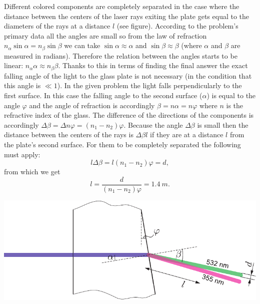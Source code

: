 \documentclass[11pt]{article}
\begin{document}
\solueng
Different colored components are completely separated in the case where the distance between the centers of the laser rays exiting the plate gets equal to the diameters of the rays at a distance $l$ (see figure). According to the problem’s primary data all the angles are small so from the law of refraction $n_\alpha\sin\alpha=n_\beta\sin\beta$ we can take $\sin\alpha\approx\alpha$ and $\sin\beta\approx\beta$ (where $\alpha$ and $\beta$ are measured in radians). Therefore the relation between the angles starts to be linear: $n_\alpha\alpha\approx n_\beta\beta$. Thanks to this in terms of finding the final answer the exact falling angle of the light to the glass plate is not necessary (in the condition that this angle is $\ll 1$). In the given problem the light falls perpendicularly to the first surface. In this case the falling angle to the second surface ($\alpha$) is equal to the angle $\varphi$ and the angle of refraction is accordingly $\beta=n\alpha=n\varphi$ where $n$ is the refractive index of the glass. The difference of the directions of the components is accordingly $\Delta\beta=\Delta n\varphi=(n_1-n_2)\varphi$. Because the angle $\Delta\beta$ is small then the distance between the centers of the rays is $\Delta\beta l$ if they are at a distance $l$ from the plate’s second surface. For them to be completely separated the following must apply:
\[
l\Delta\beta=l(n_1-n_2)\varphi=d,
\]
from which we get
\[
l = \frac{d}{(n_1-n_2)\varphi} = \SI{1.4}{m}.
\]
\begin{center}
	\includegraphics[width=0.93\linewidth]{2017-v3g-03-laser-lahend}
\end{center}
\probend
\bigskip

\end{document}
